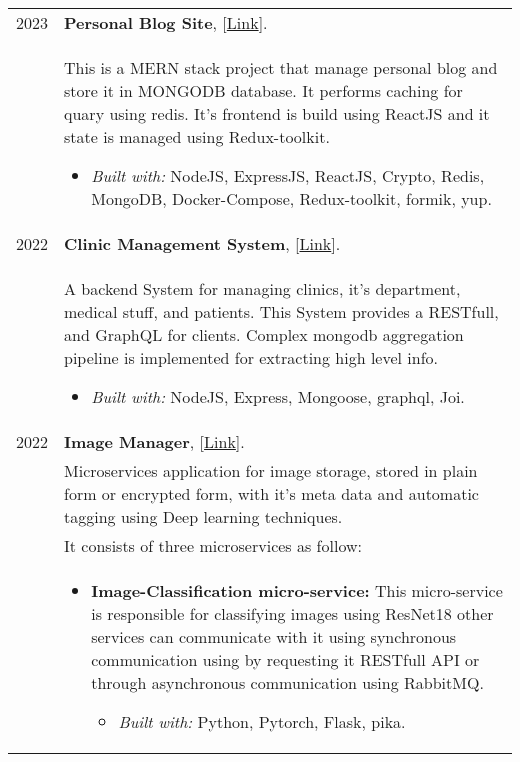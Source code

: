 \documentclass[a4paper,10pt]{article}
\begin{document}
    \begin{longtable}{r p{16cm}}
        2023  & \textbf{Personal Blog Site}, [\href{https://github.com/zaky-fetoh/Personal-Blog-Site}{Link}].\\&
        This is a MERN stack project that manage personal blog and store it in MONGODB database. It performs caching for quary using redis. It's frontend is build using ReactJS and it state is managed using Redux-toolkit.
        \begin{itemize}
            \item \textit{Built with: } NodeJS, ExpressJS,  ReactJS, Crypto, Redis, MongoDB, Docker-Compose, Redux-toolkit, formik, yup.
        \end{itemize}\\

        2022  & \textbf{Clinic Management System}, [\href{https://github.com/zaky-fetoh/Clinic-Management-System}{Link}].\\&
        A backend System for managing clinics, it's department, medical stuff, and patients. This 	System provides a RESTfull, and GraphQL for clients. Complex mongodb aggregation pipeline 	is implemented for extracting high level info.
        \begin{itemize}
            \item \textit{Built with: } NodeJS, Express, Mongoose, graphql, Joi. 
        \end{itemize}\\


        2022  & \textbf{Image Manager}, [\href{https://github.com/zaky-fetoh/image-maneger-microservices-app}{Link}].  \\& Microservices application for image storage, stored in plain form or encrypted form, with it's meta data and automatic tagging using Deep learning techniques. \\&
        It consists of three microservices as follow:\\&
        \begin{itemize}
            \item \textbf{Image-Classification micro-service:}
            This micro-service is responsible for classifying images using ResNet18 other services can communicate with it using synchronous communication using by 
            requesting it RESTfull API or through asynchronous communication using RabbitMQ.
            \begin{itemize}
                \item \textit{Built with: } Python, Pytorch, Flask, pika.
            \end{itemize}


\end{itemize}
\end{longtable}
\end{document}
